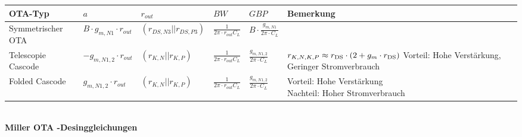 \begin{tabular}{|l|l|l|l|l|l|}
\hline
OTA-Typ & $a$ & $r_{out}$ & $BW$ & $GBP$ & Bemerkung \\
\hline
Symmetrischer OTA & $B\cdot g_{m,N1}\cdot r_{out}$ & $(r_{DS,N3}||r_{DS,P3})$ & $\frac{1}{2\pi\cdot r_{out}C_L}$ & $B\cdot \frac{g_{m,N1}}{2\pi\cdot C_L}$ & \\
\hline
Telescopie Cascode & $-g_{m,N1,2}\cdot r_{out}$ & $(r_{K,N}||r_{K,P})$ & $\frac{1}{2\pi \cdot r_{out}C_L}$ & $\frac{g_{m,N1,2}}{2\pi \cdot C_L}$ & \makecell[l]{$r_{K,N,K,P}\approx r_{\rm DS}\cdot (2+g_m\cdot r_{\rm DS})$\\Vorteil: Hohe Verstärkung,\\ Geringer Stromverbrauch}\\
\hline
Folded Cascode & $g_{m,N1,2}\cdot r_{out}$ & $(r_{K,N}||r_{K,P})$ & $\frac{1}{2\pi\cdot r_{out}C_L}$ & $\frac{g_{m,N1,2}}{2\pi\cdot C_L}$ & \makecell[l]{Vorteil: Hohe Verstärkung\\Nachteil: Hoher Stromverbrauch}\\
\hline
\end{tabular}\vspace{10pt}\\
\textbf{Miller OTA -Desinggleichungen}\\
\renewcommand{\arraystretch}{1.5}
